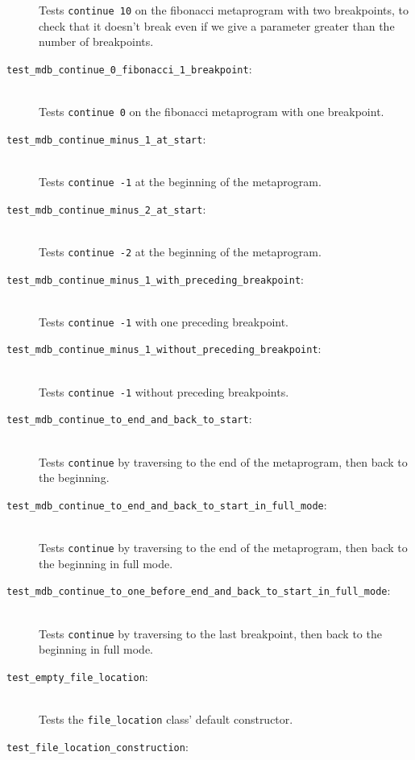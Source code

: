 \begin{description}
        Tests \texttt{continue 10} on the fibonacci metaprogram with two
        breakpoints, to check that it doesn't break even if we give a
        parameter greater than the number of breakpoints.
    \item[\texttt{test\_mdb\_continue\_0\_fibonacci\_1\_breakpoint}:] \hfill \\
        Tests \texttt{continue 0} on the fibonacci metaprogram with one
        breakpoint.
    \item[\texttt{test\_mdb\_continue\_minus\_1\_at\_start}:] \hfill \\
        Tests \texttt{continue -1} at the beginning of the metaprogram.
    \item[\texttt{test\_mdb\_continue\_minus\_2\_at\_start}:] \hfill \\
        Tests \texttt{continue -2} at the beginning of the metaprogram.
    \item[\texttt{test\_mdb\_continue\_minus\_1\_with\_preceding\_breakpoint}:] \hfill \\
        Tests \texttt{continue -1} with one preceding breakpoint.
    \item[\texttt{test\_mdb\_continue\_minus\_1\_without\_preceding\_breakpoint}:] \hfill \\
        Tests \texttt{continue -1} without preceding breakpoints.
    \item[\texttt{test\_mdb\_continue\_to\_end\_and\_back\_to\_start}:] \hfill \\
        Tests \texttt{continue} by traversing to the end of the metaprogram,
        then back to the beginning.
    \item[\texttt{test\_mdb\_continue\_to\_end\_and\_back\_to\_start\_in\_full\_mode}:] \hfill \\
        Tests \texttt{continue} by traversing to the end of the metaprogram,
        then back to the beginning in full mode.
    \item[\texttt{test\_mdb\_continue\_to\_one\_before\_end\_and\_back\_to\_start\_in\_full\_mode}:] \hfill \\
        Tests \texttt{continue} by traversing to the last breakpoint, then back
        to the beginning in full mode.
    \item[\texttt{test\_empty\_file\_location}:] \hfill \\
        Tests the \texttt{file\_location} class' default constructor.
    \item[\texttt{test\_file\_location\_construction}:] \hfill \\

\end{description}
